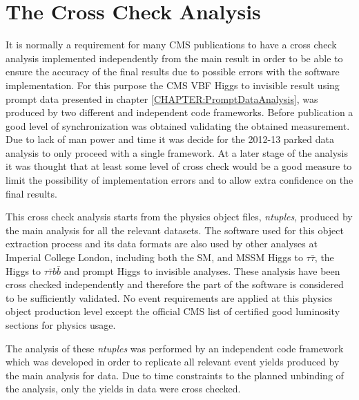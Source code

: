 \section{The Cross Check Analysis}
\label{CHAPTER:ParkedDataAnalysis_CrossCheckAnalysis}


It is normally a requirement for many \gls{CMS} publications to have a cross check analysis implemented independently from the main result in order to be able to ensure the accuracy of the final results due to possible errors with the software implementation. For this purpose the \gls{CMS} \gls{VBF} Higgs to invisible result using prompt data presented in chapter \ref{CHAPTER:PromptDataAnalysis}, was produced by two different and independent code frameworks. Before publication a good level of synchronization was obtained validating the obtained measurement. Due to lack of man power and time it was decide for the 2012-13 parked data analysis to only proceed with a single framework. At a later stage of the analysis it was thought that at least some level of cross check would be a good measure to limit the possibility of implementation errors and to allow extra confidence on the final results.
 
This cross check analysis starts from the physics object files, \textit{ntuples}, produced by the main analysis for all the relevant datasets. The software used for this object extraction process and its data formats are also used by other analyses at Imperial College London, including both the \gls{SM}, and \gls{MSSM} Higgs to $\tau\bar{\tau}$, the Higgs to $\tau\bar{\tau}b\bar{b}$ and prompt Higgs to invisible analyses. These analysis have been cross checked independently and therefore the part of the software is considered to be sufficiently validated. No event requirements are applied at this physics object production level except the official \gls{CMS} list of certified good luminosity sections for physics usage.
 
The analysis of these \textit{ntuples} was performed by an independent code framework which was developed in order to replicate all relevant event yields produced by the main analysis for data. Due to time constraints to the planned unbinding of the analysis, only the yields in data were cross checked.  

